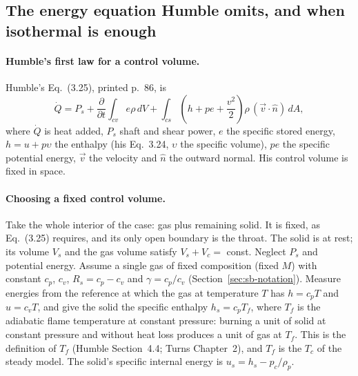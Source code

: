 \subsection{The energy equation Humble omits, and when isothermal is enough}
\label{sec:ld-energy}
\paragraph{Humble's first law for a control volume.} Humble's
Eq.~(3.25), printed p.~86, is
\[
 \dot Q=P_s+\frac{\partial}{\partial t}\int_{cv}e\rho\,dV
 +\int_{cs}\left(h+pe+\frac{v^2}{2}\right)\rho\,
   (\vec v\cdot\hat n)\,dA ,
\]
where $\dot Q$ is heat added, $P_s$ shaft and shear power, $e$ the
specific stored energy, $h=u+p\upsilon$ the enthalpy (his Eq.~3.24,
$\upsilon$ the specific volume), $pe$ the specific potential energy,
$\vec v$ the velocity and $\hat n$ the outward normal. His control
volume is fixed in space.

\paragraph{Choosing a fixed control volume.} Take the whole interior
of the case: gas plus remaining solid. It is fixed, as Eq.~(3.25)
requires, and its only open boundary is the throat. The solid is at
rest; its volume $V_s$ and the gas volume satisfy $V_s+V_c=$ const.
Neglect $P_s$ and potential energy. Assume a single gas of fixed
composition (fixed $M$) with constant $c_p$, $c_v$,
$R_s=c_p-c_v$ and $\gamma=c_p/c_v$ (Section~\ref{sec:sb-notation}).
Measure energies from the reference at which the gas at temperature
$T$ has $h=c_pT$ and $u=c_vT$, and give the solid the specific enthalpy
$h_s=c_pT_f$, where $T_f$ is the adiabatic flame temperature at
constant pressure: burning a unit of solid at constant pressure and
without heat loss produces a unit of gas at $T_f$. This is the
definition of $T_f$ (Humble Section~4.4; Turns Chapter~2), and $T_f$
is the $T_c$ of the steady model. The solid's specific internal
energy is $u_s=h_s-p_c/\rho_p$.

